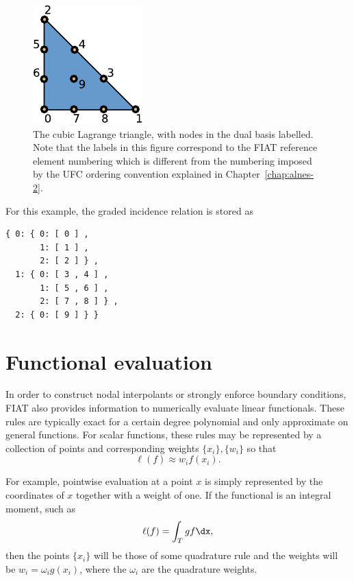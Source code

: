 \begin{figure}
  \centering
  \includegraphics[width=\smallfig]{chapters/kirby-2/pdf/P3.pdf}
  \caption{The cubic Lagrange triangle, with nodes in the dual basis
    labelled. Note that the labels in this figure correspond to the
    FIAT reference element numbering which is different from the
    numbering imposed by the UFC ordering convention explained in
    Chapter~\ref{chap:alnes-2}.}
  \label{fig:p3}
\end{figure}

For this example, the graded incidence relation is stored as
\begin{verbatim}
{ 0: { 0: [ 0 ] ,
       1: [ 1 ] ,
       2: [ 2 ] } ,
  1: { 0: [ 3 , 4 ] ,
       1: [ 5 , 6 ] ,
       2: [ 7 , 8 ] } ,
  2: { 0: [ 9 ] } }
\end{verbatim}

\section{Functional evaluation}

In order to construct nodal interpolants or strongly enforce boundary
conditions, FIAT also provides information to numerically evaluate
linear functionals.  These rules are typically exact for a certain
degree polynomial and only approximate on general functions.  For scalar
functions, these rules may be represented by a collection of points and
corresponding weights $\{ x_i \} , \{ w_i \}$ so that
\begin{equation}
\ell( f ) \approx w_i f(x_i).
\end{equation}

For example, pointwise evaluation at a point \( x \) is simply represented
by the coordinates of \( x \) together with a weight of one. If the
functional is an integral moment, such as
\begin{equation}
\ell( f ) = \int_T g f \dx,
\end{equation}
then the points $\{ x_i \}$ will be those of some quadrature rule and
the weights will be $w_i = \omega_i g(x_i)$, where the $\omega_i$
are the quadrature weights.

